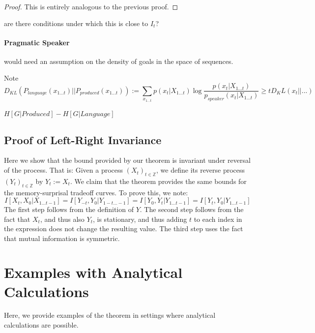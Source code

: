 \documentclass[11pt,letterpaper]{article}
\newcounter{theorem}
\begin{document}
\begin{proof}
This is entirely analogous to the previous proof.
\end{proof}


are there conditions under which this is close to $I_t$?

\paragraph{Pragmatic Speaker}

would need an assumption on the density of goals in the space of sequences.


Note 
\begin{equation}
	D_{KL}(P_{language}(x_{1\dots t})||P_{produced}(x_{1\dots t}))  := \sum_{x_{1\dots t}} p(x_t|X_{1\dots t}) \log \frac{p(x_t|X_{1\dots t})}{p_{speaker}(x_t|X_{1\dots t})} \geq t D_KL(x_t||...)
\end{equation}

$H[G|Produced] - H[G|Language]$



\subsection{Proof of Left-Right Invariance}

Here we show that the bound provided by our theorem is invariant under reversal of the process.
That is: Given a process $(X_t)_{t \in \mathbb{Z}}$, we define its reverse process $(Y_t)_{t \in \mathbb{Z}}$ by $Y_t := X_t$.
We claim that the theorem provides the same bounds for the memory-surprisal tradeoff curves.
To prove this, we note:
\begin{equation}
	I[X_t, X_0|X_{1\dots t-1}] = I[Y_{-t}, Y_0|Y_{1-t\dots -1}] = I[Y_0, Y_t|Y_{1\dots t-1}] = I[Y_t, Y_0|Y_{1\dots t-1}]
\end{equation}
The first step follows from the definition of $Y$. The second step follows from the fact that $X_t$, and thus also $Y_t$, is stationary, and thus adding $t$ to each index in the expression does not change the resulting value. The third step uses the fact that mutual information is symmetric.


\section{Examples with Analytical Calculations}

Here, we provide examples of the theorem in settings where analytical calculations are possible.
\end{document}
